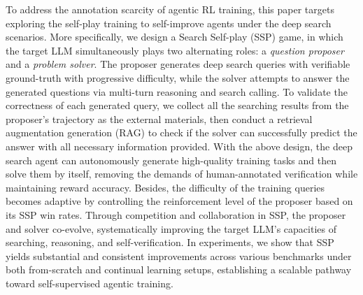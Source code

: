 \documentclass[10pt, a4paper, logo]{googledeepmind} %
\newcommand{\pengyu}[1]{{\color{blue}{[\bf\sf Pengyu: #1]}}}
\begin{document}

To address the annotation scarcity of agentic RL training, this paper targets exploring the self-play training to self-improve agents under the deep search scenarios. More specifically, we design a Search Self-play (SSP) game, 
in which the target LLM simultaneously plays two alternating roles: a \textit{question proposer} and a \textit{problem solver}. 
The proposer generates deep search queries with verifiable ground-truth with progressive difficulty, while the solver attempts to answer the generated questions via multi-turn reasoning and search calling. 
%
To validate the correctness of each generated query, we collect all the searching results from the proposer's trajectory as the external materials, then conduct a retrieval augmentation generation (RAG) to check if the solver can successfully predict the answer with all necessary information provided. %
%
With the above design, the deep search agent can autonomously generate high-quality training tasks and then solve them by itself, removing the demands of human-annotated verification while maintaining reward accuracy. 
%
%
Besides, the difficulty of the training queries becomes adaptive by controlling the reinforcement level of the proposer based on its SSP win rates.
%
Through competition and collaboration in SSP, the proposer and solver co-evolve, systematically improving the target LLM's capacities of searching, reasoning, and self-verification. In experiments, we show that SSP yields substantial and consistent improvements across various benchmarks under both from-scratch and continual learning setups, establishing a scalable pathway toward self-supervised agentic training.
\end{document}
